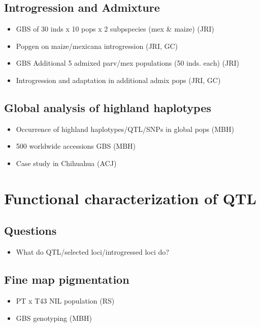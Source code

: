 \documentclass[]{article}
\begin{document}
\subsection{Introgression and Admixture}
\begin{itemize}
\item GBS of 30 inds x 10 pops x 2 subpspecies (mex \& maize) (JRI)
\item Popgen on maize/mexicana introgression (JRI, GC)
\item GBS Additional 5 admixed parv/mex populations (50 inds. each) (JRI)
\item Introgression and adaptation in additional admix pops (JRI, GC)
\end{itemize}

\subsection{Global analysis of highland haplotypes}
\begin{itemize}
\item Occurrence of highland haplotypes/QTL/SNPs in global pops (MBH)
\item 500 worldwide accessions GBS (MBH)
\item Case study in Chihuahua (ACJ)
\end{itemize}

\section{Functional characterization of QTL}

\subsection{Questions}
\begin{itemize}
\item What do QTL/selected loci/introgressed loci do?
\end{itemize}

\subsection{Fine map pigmentation}
\begin{itemize}
\item PT x T43 NIL population (RS)
\item GBS genotyping (MBH)
\end{itemize}
\end{document}
